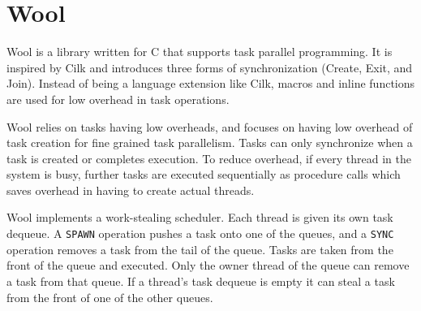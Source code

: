 \section{Wool}
Wool\cite{wool} is a library written for C that supports task parallel programming. It is inspired by Cilk and introduces
three forms of synchronization (Create, Exit, and Join). Instead of being a language extension like Cilk, macros and
inline functions are used for low overhead in task operations. 

Wool relies on tasks having low overheads, and focuses on having low overhead of task creation for fine grained task parallelism. 
Tasks can only synchronize when a task is created or completes execution. To reduce overhead, if every thread
in the system is busy, further tasks are executed sequentially as procedure calls which saves overhead in having
to create actual threads.

Wool implements a work-stealing scheduler.
Each thread is given its own task dequeue. A \texttt{SPAWN} operation pushes a task onto 
one of the queues, and a \texttt{SYNC} operation removes a task from the tail of the queue.
Tasks are taken from the front of the queue and executed. Only the owner thread of the queue can remove a task from that queue. 
If a thread's task dequeue is empty it can steal a task from the front of one of the other queues.

